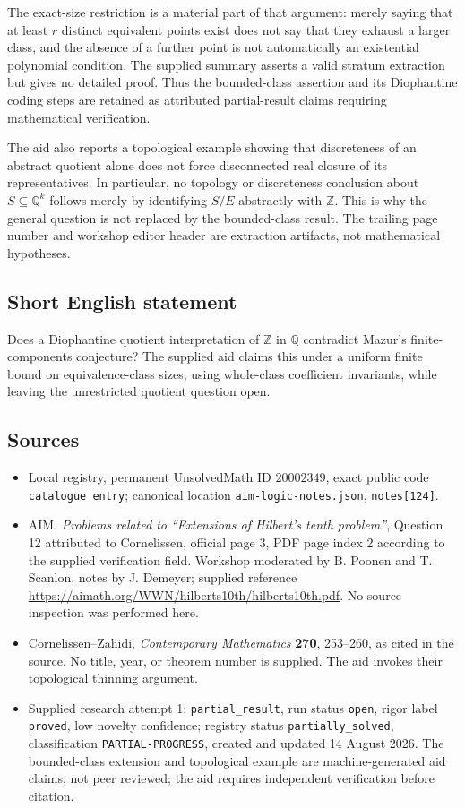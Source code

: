 \documentclass[11pt]{article}
\newcommand{\Z}{\mathbb{Z}}
\newcommand{\Q}{\mathbb{Q}}
\begin{document}
The exact-size restriction is a material part of that argument: merely saying that at least \(r\) distinct equivalent points exist does not say that they exhaust a larger class, and the absence of a further point is not automatically an existential polynomial condition. The supplied summary asserts a valid stratum extraction but gives no detailed proof. Thus the bounded-class assertion and its Diophantine coding steps are retained as attributed partial-result claims requiring mathematical verification.

The aid also reports a topological example showing that discreteness of an abstract quotient alone does not force disconnected real closure of its representatives. In particular, no topology or discreteness conclusion about \(S\subseteq\Q^k\) follows merely by identifying \(S/E\) abstractly with \(\Z\). This is why the general question is not replaced by the bounded-class result. The trailing page number and workshop editor header are extraction artifacts, not mathematical hypotheses.
\subsection{Short English statement}
Does a Diophantine quotient interpretation of \(\Z\) in \(\Q\) contradict Mazur's finite-components conjecture? The supplied aid claims this under a uniform finite bound on equivalence-class sizes, using whole-class coefficient invariants, while leaving the unrestricted quotient question open.
\subsection{Sources}
\begin{itemize}
\item Local registry, permanent UnsolvedMath ID \(20002349\), exact public code \texttt{catalogue entry}; canonical location \texttt{aim-logic-notes.json}, \texttt{notes[124]}.
\item AIM, \emph{Problems related to ``Extensions of Hilbert's tenth problem''}, Question 12 attributed to Cornelissen, official page 3, PDF page index 2 according to the supplied verification field. Workshop moderated by B. Poonen and T. Scanlon, notes by J. Demeyer; supplied reference \url{https://aimath.org/WWN/hilberts10th/hilberts10th.pdf}. No source inspection was performed here.
\item Cornelissen--Zahidi, \emph{Contemporary Mathematics} \textbf{270}, 253--260, as cited in the source. No title, year, or theorem number is supplied. The aid invokes their topological thinning argument.
\item Supplied research attempt 1: \texttt{partial\_result}, run status \texttt{open}, rigor label \texttt{proved}, low novelty confidence; registry status \texttt{partially\_solved}, classification \texttt{PARTIAL-PROGRESS}, created and updated 14 August 2026. The bounded-class extension and topological example are machine-generated aid claims, not peer reviewed; the aid requires independent verification before citation.
\end{itemize}
\end{document}

